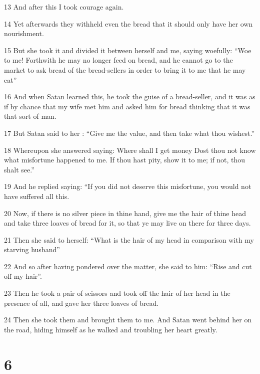\par 13 And after this I took courage again.

\par 14 Yet afterwards they withheld even the bread that it should only have her own nourishment.

\par 15 But she took it and divided it between herself and me, saying woefully: “Woe to me! Forthwith he may no longer feed on bread, and he cannot go to the market to ask bread of the bread-sellers in order to bring it to me that he may eat”

\par 16 And when Satan learned this, he took the guise  of a bread-seller, and it was as if by chance that my wife met him and asked him for bread thinking that it was that sort of man.

\par 17 But Satan said to her : “Give me the value, and then take what thou wishest.”

\par 18 Whereupon she answered saying: Where shall I get money Dost thou not know what misfortune happened to me. If thou hast pity, show it to me; if not, thou shalt see.”

\par 19 And he replied saying: “If you did not deserve this misfortune, you would not have suffered all this.

\par 20 Now, if there is no silver piece in thine hand, give me the hair of thine head and take three loaves of bread for it, so that ye may live on there for three days.

\par 21 Then she said to herself: “What is the hair of my head in comparison with my starving husband”

\par 22 And so after having pondered over the matter, she said to him: “Rise and cut off my hair”.

\par 23 Then he took a pair of scissors and took off the hair of her head in the presence of all, and gave her three loaves of bread.

\par 24 Then she took them and brought them to me. And Satan went behind her on the road, hiding himself as he walked and troubling her heart greatly.

\chapter{6}

